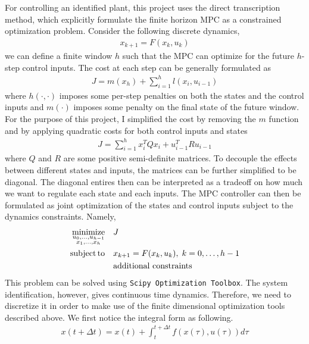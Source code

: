 \documentclass[10pt,twocolumn]{article}
\DeclareMathOperator*{\minimize}{minimize}
\DeclareMathOperator*{\subto}{subject\,to}
\begin{document}
For controlling an identified plant, this project uses the direct transcription method,
which explicitly formulate the finite horizon
MPC as a constrained optimization problem. Consider the following discrete dynamics,
\begin{gather}
  x_{k+1} = F(x_k, u_k)
\end{gather}
we can define a finite window $h$ such that the MPC can optimize for the future $h$-step
control inputs. The cost at each step can be generally formulated as
\begin{gather}
  J = m(x_h) + \sum_{i=1}^h l(x_i, u_{i-1})
\end{gather}
where $h(\cdot, \cdot)$ imposes some per-step penalties on both the states and the control inputs
and $m(\cdot)$ imposes some penalty on the final state of the future window. For the purpose
of this project, I simplified the cost by removing the $m$ function and
by applying quadratic costs for both control inputs and states
\begin{gather}
  J = \sum_{i=1}^h x_i^T Q x_i + u_{i-1}^T R u_{i-1}
\end{gather}
where $Q$ and $R$ are some positive semi-definite matrices.
To decouple the effects between different
states and inputs, the matrices can be further simplified to be diagonal. The diagonal entires
then can be interpreted as a tradeoff on how much we want to regulate each state and each
inputs. The MPC controller can then be formulated as joint optimization of the states and
control inputs subject to the dynamics constraints. Namely,
\begin{gather}
  \begin{aligned}
    \minimize_{\begin{subarray}{c}u_0,\ldots,u_{h-1} \\ x_1,\ldots,x_h\end{subarray}}\quad &J \\
      \subto\quad &x_{k+1} = F(x_k, u_k),\; k=0,\ldots,h-1 \\
      &\text{additional constraints}
  \end{aligned}
\end{gather}
This problem can be solved using \texttt{Scipy Optimization Toolbox}.
The system identification, however, gives continuous time dynamics. Therefore, we need to discretize
it in order to make use of the finite dimensional optimization tools described above.
We first notice the integral form as following.
\begin{gather}
  x(t + \Delta t) = x(t) + \int_t^{t + \Delta t} f(x(\tau), u(\tau)) d\tau
\end{gather}
\end{document}
